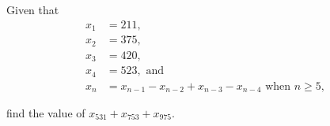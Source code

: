 Given that
\begin{align*}
x_{1}&=211,\\ 
x_{2}&=375,\\ 
x_{3}&=420,\\ 
x_{4}&=523, \text{ and}\\ 
x_{n}&=x_{n-1}-x_{n-2}+x_{n-3}-x_{n-4} \text{ when } n \geq 5, 
\end{align*}

find the value of $x_{531}+x_{753}+x_{975}$.